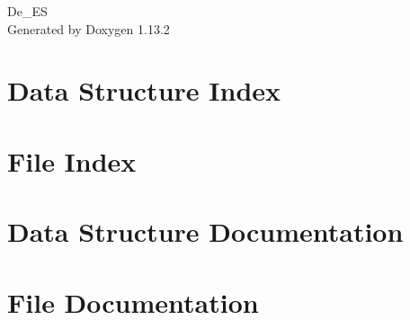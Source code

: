 \documentclass[twoside]{book}
\newcommand{\+}{\discretionary{\mbox{\scriptsize$\hookleftarrow$}}{}{}}
\newcommand{\clearemptydoublepage}{%
    \newpage{\pagestyle{empty}\cleardoublepage}%
  }
\begin{document}
  \raggedbottom
    \hypersetup{pageanchor=false,
                bookmarksnumbered=true,
                pdfencoding=unicode
               }
  \begin{titlepage}
  \vspace*{7cm}
  \begin{center}%
  {\Large De\+\_\+\+ES}\\
  \vspace*{1cm}
  {\large Generated by Doxygen 1.13.2}\\
  \end{center}
  \end{titlepage}
  \clearemptydoublepage
  \tableofcontents
  \clearemptydoublepage
  \hypersetup{pageanchor=true}

\chapter{Data Structure Index}

\chapter{File Index}

\chapter{Data Structure Documentation}

\chapter{File Documentation}














  \backmatter
  \newpage
  \clearemptydoublepage
  \printindex
\end{document}
